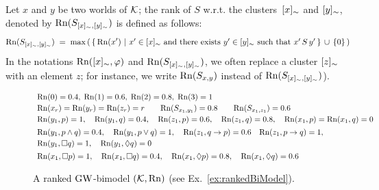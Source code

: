 \noindent
Let $x$ and $y$ be two worlds of $\mathcal{K}$; the rank of $S$ w.r.t. the clusters~$[x]_\sim$ and $[y]_\sim$,
denoted by $\mathrm{Rn}(S_{[x]_\sim,[y]_\sim})$   is defined as follows:
\[
\mathrm{Rn}(S_{[x]_\sim,[y]_\sim}) \;=\; \max\left(\,\{\,
  \mathrm{Rn}(x')~|~\mbox{$x' \in [x]_\sim$ and there exists $y'\in[y]_\sim$ such that $x'\,S\, y'$} 
  \,\}\,\cup\,\{0\}\,
\right)
\]
In the notations  $\mathrm{Rn}([x]_\sim,\varphi)$ and $\mathrm{Rn}(S_{[x]_\sim,[y]_\sim})$,
we often replace a   cluster $[z]_\sim$ with an element $z$;
for instance, 
we write $\mathrm{Rn}(S_{x,y})$   instead of $\mathrm{Rn}(S_{[x]_\sim,[y]_\sim})$).



\begin{figure}[t]
  \centering
    \begin{tikzpicture}[scale=0.8]
      
          \end{tikzpicture}
\[
    \begin{array}{l}
      \mathrm{Rn}(0)=0.4,\;\mathrm{Rn}(1)=0.6,\; \mathrm{Rn}(2)=0.8,\; \mathrm{Rn}(3)=1
      \\[0.5ex]
      \mathrm{Rn}(x_r)=   \mathrm{Rn}(y_r)=   \mathrm{Rn}(z_r)= r\qquad
      \mathrm{Rn}(S_{x_1,y_1}) = 0.8  \qquad  \mathrm{Rn}(S_{x_1,z_1}) = 0.6 
 \\[0.5ex]
      \mathrm{Rn}(y_1,p)=1,\quad \mathrm{Rn}(y_1,q)=0.4,\quad \mathrm{Rn}(z_1,p)=0.6,\quad \mathrm{Rn}(z_1,q)=0.8,\quad
      \mathrm{Rn}(x_1,p)=\mathrm{Rn}(x_1,q)=0
 \\[1ex]
      \mathrm{Rn}(y_1,p\land q) =0.4,\quad   \mathrm{Rn}(y_1,p\lor q) =1,\quad  \mathrm{Rn}(z_1,q\to p) =0.6\quad \mathrm{Rn}(z_1,p\to q) = 1,
\\[.5ex]
      \mathrm{Rn}(y_1,\Box q) =1,\quad \mathrm{Rn}(y_1,\lozenge q) =0
 \\[1ex]
      \mathrm{Rn}(x_1,\Box p) =1,\quad \mathrm{Rn}(x_1,\Box q) =0.4,\quad
  \mathrm{Rn}(x_1,\lozenge p) =0.8,\quad \mathrm{Rn}(x_1,\lozenge q) = 0.6
    \end{array}
\]
  \caption{A ranked $\mbox{$\mathrm{GW}$}$-bimodel $(\mathcal{K},\mathrm{Rn})$ (see Ex.~\ref{ex:rankedBiModel}).}
  \label{fig:rankedBiModel}
\end{figure}




